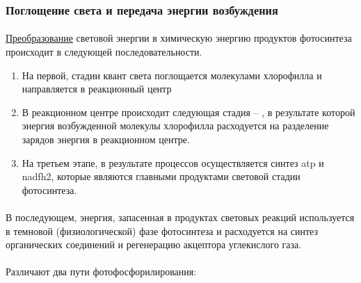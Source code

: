 \subsubsection*{Поглощение света и передача энергии возбуждения}

\paragraph*{}\hyperlink{question_chem_phys}{Преобразование} световой энергии в химическую энергию продуктов фотосинтеза происходит в следующей последовательности.

\begin{enumerate}

\item На первой,  стадии квант света поглощается молекулами хлорофилла и направляется в реакционный центр
\item В реакционном центре происходит следующая стадия -- , в результате которой энергия возбужденной молекулы хлорофилла расходуется на разделение зарядов энергия в реакционном центре. 


\item На третьем этапе, в результате  процессов осуществляется синтез \gls{atp} и \gls{nadfh2}, которые являются главными продуктами световой стадии фотосинтеза.

\end{enumerate} 

\paragraph*{}В последующем, энергия, запасенная в продуктах световых реакций используется в темновой (физиологической) фазе фотосинтеза и расходуется на синтез органических соединений и регенерацию акцептора углекислого газа.


\paragraph*{}Различают два пути фотофосфорилирования:

